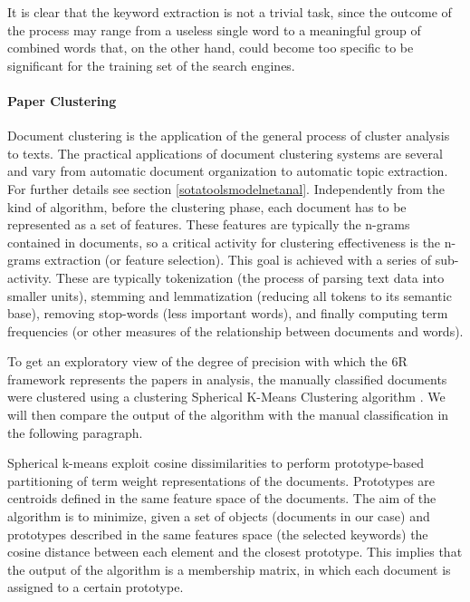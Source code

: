 \documentclass[]{book}
\let\oldparagraph\paragraph
\renewcommand{\paragraph}[1]{\oldparagraph{#1}\mbox{}}
\begin{document}
It is clear that the keyword extraction is not a trivial task, since the
outcome of the process may range from a useless single word to a
meaningful group of combined words that, on the other hand, could become
too specific to be significant for the training set of the search
engines.

\paragraph{Paper Clustering}\label{paper-clustering}

Document clustering is the application of the general process of cluster
analysis to texts. The practical applications of document clustering
systems are several and vary from automatic document organization to
automatic topic extraction. For further details see section
\ref{sotatoolsmodelnetanal}. Independently from the kind of algorithm,
before the clustering phase, each document has to be represented as a
set of features. These features are typically the n-grams contained in
documents, so a critical activity for clustering effectiveness is the
n-grams extraction (or feature selection). This goal is achieved with a
series of sub-activity. These are typically tokenization (the process of
parsing text data into smaller units), stemming and lemmatization
(reducing all tokens to its semantic base), removing stop-words (less
important words), and finally computing term frequencies (or other
measures of the relationship between documents and words).

To get an exploratory view of the degree of precision with which the 6R
framework represents the papers in analysis, the manually classified
documents were clustered using a clustering Spherical K-Means Clustering
algorithm \citep{buchta2012spherical}. We will then compare the output
of the algorithm with the manual classification in the following
paragraph.

Spherical k-means exploit cosine dissimilarities to perform
prototype-based partitioning of term weight representations of the
documents. Prototypes are centroids defined in the same feature space of
the documents. The aim of the algorithm is to minimize, given a set of
objects (documents in our case) and prototypes described in the same
features space (the selected keywords) the cosine distance between each
element and the closest prototype. This implies that the output of the
algorithm is a membership matrix, in which each document is assigned to
a certain prototype.
\end{document}
